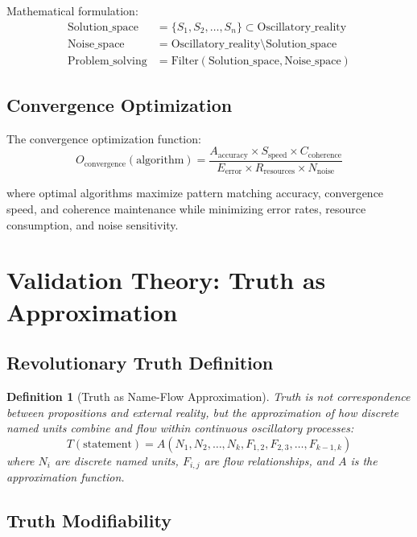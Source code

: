 \documentclass[11pt,twocolumn]{article}
\newtheorem{definition}[theorem]{Definition}
\theoremstyle{remark}
\begin{document}
Mathematical formulation:
\begin{align}
\text{Solution\_space} &= \{S_1, S_2, \ldots, S_n\} \subset \text{Oscillatory\_reality} \\
\text{Noise\_space} &= \text{Oscillatory\_reality} \setminus \text{Solution\_space} \\
\text{Problem\_solving} &= \text{Filter}(\text{Solution\_space}, \text{Noise\_space})
\end{align}

\subsection{Convergence Optimization}

The convergence optimization function:
\begin{equation}
O_{\text{convergence}}(\text{algorithm}) = \frac{A_{\text{accuracy}} \times S_{\text{speed}} \times C_{\text{coherence}}}{E_{\text{error}} \times R_{\text{resources}} \times N_{\text{noise}}}
\end{equation}

where optimal algorithms maximize pattern matching accuracy, convergence speed, and coherence maintenance while minimizing error rates, resource consumption, and noise sensitivity.

\section{Validation Theory: Truth as Approximation}

\subsection{Revolutionary Truth Definition}

\begin{definition}[Truth as Name-Flow Approximation]
Truth is not correspondence between propositions and external reality, but the approximation of how discrete named units combine and flow within continuous oscillatory processes:
\begin{equation}
T(\text{statement}) = A(N_1, N_2, \ldots, N_k, F_{1,2}, F_{2,3}, \ldots, F_{k-1,k})
\end{equation}
where $N_i$ are discrete named units, $F_{i,j}$ are flow relationships, and $A$ is the approximation function.
\end{definition}

\subsection{Truth Modifiability}
\end{document}
